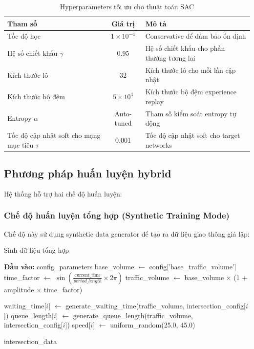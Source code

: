 \begin{table}[!htp]
\centering
\caption{Hyperparameters tối ưu cho thuật toán SAC}
\label{tab:sac_hyperparameters}
\begin{tabular}{|l|c|p{5cm}|}
\hline
\textbf{Tham số} & \textbf{Giá trị} & \textbf{Mô tả} \\
\hline
Tốc độ học & $1 \times 10^{-4}$ & Conservative để đảm bảo ổn định \\
\hline
Hệ số chiết khấu $\gamma$ & 0.95 & Hệ số chiết khấu cho phần thưởng tương lai \\
\hline
Kích thước lô & 32 & Kích thước lô cho mỗi lần cập nhật \\
\hline
Kích thước bộ đệm & $5 \times 10^{4}$ & Kích thước bộ đệm experience replay \\
\hline
Entropy $\alpha$ & Auto-tuned & Tham số kiểm soát entropy tự động \\
\hline
Tốc độ cập nhật soft cho mạng mục tiêu $\tau$ & 0.001 & Tốc độ cập nhật soft cho target networks \\
\hline
\end{tabular}
\end{table}

\subsection{Phương pháp huấn luyện hybrid}
Hệ thống hỗ trợ hai chế độ huấn luyện:

\subsubsection{Chế độ huấn luyện tổng hợp (Synthetic Training Mode)}
Chế độ này sử dụng synthetic data generator để tạo ra dữ liệu giao thông giả lập:

\begin{algorithm}[!htp]
    \caption{Sinh dữ liệu tổng hợp}
    \begin{algorithmic}[1]
        \State \textbf{Đầu vào:} config\_parameters
        \State base\_volume $\leftarrow$ config['base\_traffic\_volume'] 
        \State time\_factor $\leftarrow$ $\sin(\frac{\text{current\_time}}{period\_length} \times 2\pi)$
        \State traffic\_volume $\leftarrow$ base\_volume $\times$ (1 + amplitude $\times$ time\_factor) 
        
            \State waiting\_time[$i$] $\leftarrow$ generate\_waiting\_time(traffic\_volume, intersection\_config[$i$])
            \State queue\_length[$i$] $\leftarrow$ generate\_queue\_length(traffic\_volume, intersection\_config[$i$])
            \State speed[$i$] $\leftarrow$ uniform\_random(25.0, 45.0) 
        \EndFor 
        
        \State \Return intersection\_data
    \end{algorithmic}
\end{algorithm}

